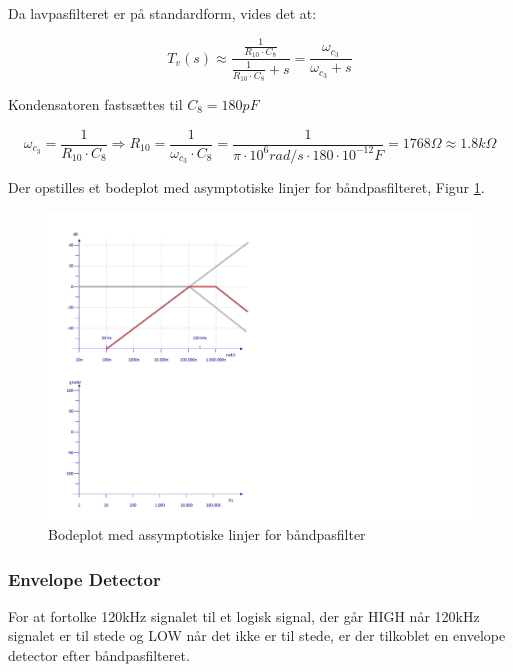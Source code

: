 Da lavpasfilteret er på standardform, vides det at:

\begin{displaymath}
T_{v}(s)\approx \dfrac{ \tfrac{ 1 }{ R_{10} \cdot C_{8}} }{ \tfrac{ 1 }{ R_{10} \cdot C_{8}} +s }=
\dfrac{\omega_{c_{3}}}{\omega_{c_{3}}+s}
\end{displaymath}

Kondensatoren fastsættes til $C_{8}=180pF$

\begin{displaymath}
\omega_{c_{3}} = \dfrac{ 1 }{ R_{10} \cdot C_{8}} \Rightarrow 
R_{10}=\dfrac{1}{\omega_{c_{3}} \cdot C_{8}}=
\dfrac{1}{\pi \cdot 10^{6} rad/s \cdot 180 \cdot 10^{-12}F}=1768\Omega \approx 1.8k\Omega
\end{displaymath}

Der opstilles et bodeplot med asymptotiske linjer for båndpasfilteret, Figur \ref{fig:BodePlotBPF}. 

\begin{figure}[h]
	\centering
	\includegraphics[scale=0.5, trim=50 430 590 50, clip=true]{../HardwareDesign/Diagrammer/BodePlotBPF.pdf}
	\caption{Bodeplot med assymptotiske linjer for båndpasfilter}
	\label{fig:BodePlotBPF}
\end{figure}

\subsubsection{Envelope Detector}
For at fortolke 120kHz signalet til et logisk signal, der går HIGH når 120kHz signalet er til stede og LOW når det ikke er til stede, er der tilkoblet en envelope detector efter båndpasfilteret.

